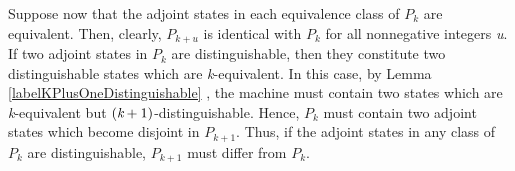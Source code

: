 \documentclass[a4paper]{report}
\begin{document}
    Suppose now that the adjoint states in each equivalence class of $P_k$ are equivalent. Then, clearly, $P_{k+u}$ is identical with $P_k$ for all nonnegative integers \emph{u}. If two adjoint states in $P_k$ are distinguishable, then they constitute two distinguishable states which are \emph{k}-equivalent. In this case, by Lemma \ref{labelKPlusOneDistinguishable} , the machine must contain two states which are \emph{k}-equivalent but $(\emph{k}+1)$-distinguishable. Hence, $P_k$ must contain two adjoint states which become disjoint in $P_{k+1}$. Thus, if the adjoint states in any class of $P_k$ are distinguishable, $P_{k+1}$ must differ from $P_{k}$. 
\end{document}
